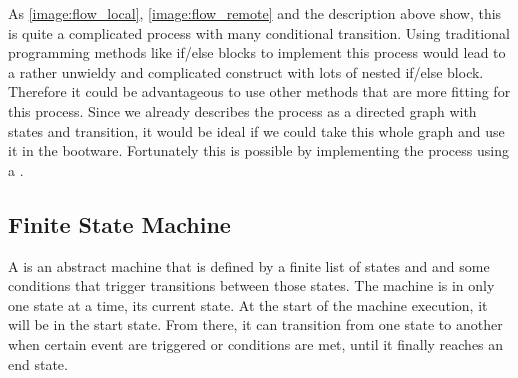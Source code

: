 As \autoref{image:flow_local}, \autoref{image:flow_remote} and the description above show, this is quite a complicated process with many conditional transition.
Using traditional programming methods like if/else blocks to implement this process would lead to a rather unwieldy and complicated construct with lots of nested if/else block.
Therefore it could be advantageous to use other methods that are more fitting for this process.
Since we already describes the process as a directed graph with states and transition, it would be ideal if we could take this whole graph and use it in the bootware.
Fortunately this is possible by implementing the process using a .

\subsection{Finite State Machine}

A  is an abstract machine that is defined by a finite list of states and and some conditions that trigger transitions between those states.
The machine is in only one state at a time, its current state.
At the start of the machine execution, it will be in the start state.
From there, it can transition from one state to another when certain event are triggered or conditions are met, until it finally reaches an end state.
